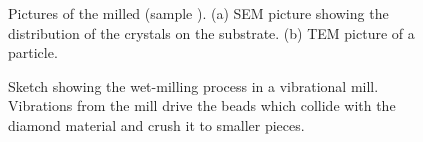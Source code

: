 	\begin{figure}[tp]
		\begin{subfigure}[t]{ 0.49\linewidth}
			\caption{}\label{subfig::sem_milled}
			\centering
		\end{subfigure}
		\hfill
		\begin{subfigure}[t]{ 0.49\linewidth}
			\caption{}\label{subfig::tem_milled}
			\centering
		\end{subfigure}
		\caption{Pictures of the milled \nds (sample \insituH). (a) SEM picture showing the distribution of the \nd crystals on the \ir substrate. (b) TEM picture of a \nd particle.}
		\label{fig::semtem_millled}
	\end{figure}

	\begin{figure}[tp]
		\centering
		\caption{Sketch showing the wet-milling process in a vibrational mill. Vibrations from the mill drive the beads which collide with the diamond material and crush it to smaller pieces.}
		\label{fig::sketch_basd}
	\end{figure}

